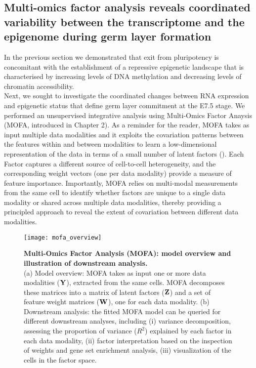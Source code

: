 \subsection{Multi-omics factor analysis reveals coordinated variability between the transcriptome and the epigenome during germ layer formation} \label{section:mofa_gastrulation}

In the previous section we demonstrated that exit from pluripotency is concomitant with the establishment of a repressive epigenetic landscape that is characterised by increasing levels of DNA methylation and decreasing levels of chromatin accessibility. \\
Next, we sought to investigate the coordinated changes between RNA expression and epigenetic status that define germ layer commitment at the E7.5 stage. We performed an unsupervised integrative analysis using Multi-Omics Factor Anaysis (MOFA, introduced in Chapter 2). As a reminder for the reader, MOFA takes as input multiple data modalities and it exploits the covariation patterns between the features within and between modalities to learn a low-dimensional representation of the data in terms of a small number of latent factors (). Each Factor captures a different source of cell-to-cell heterogeneity, and the corresponding weight vectors (one per data modality) provide a measure of feature importance. Importantly, MOFA relies on multi-modal measurements from the same cell to identify whether factors are unique to a single data modality or shared across multiple data modalities, thereby providing a principled approach to reveal the extent of covariation between different data modalities.

\begin{figure}[H]
	\texttt{[image: mofa\_overview]}
	\caption{
	\textbf{Multi-Omics Factor Analysis (MOFA): model overview and illustration of downstream analysis.} \\
	(a) Model overview: MOFA takes as input one or more data modalities (${\bf Y}$), extracted from the same cells. MOFA decomposes these matrices into a matrix of latent factors (${\bf Z}$) and a set of feature weight matrices (${\bf W}$), one for each data modality.
	(b) Downstream analysis: the fitted MOFA model can be queried for different downstream analyses, including (i) variance decomposition, assessing the proportion of variance ($R^2$) explained by each factor in each data modality, (ii) factor interpretation based on the inspection of weights and gene set enrichment analysis, (iii) visualization of the cells in the factor space. 
	}
	\label{fig:mofa_overview}
\end{figure}

